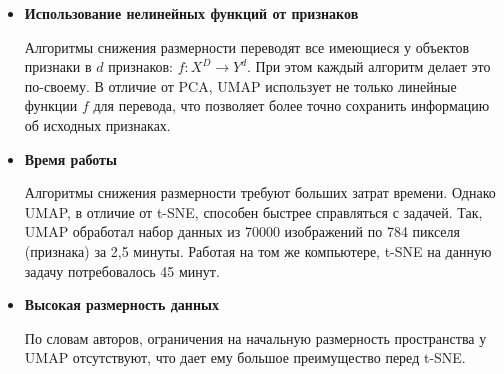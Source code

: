 \begin{itemize}
	\item \textbf{Использование нелинейных функций от признаков}
	
	Алгоритмы снижения размерности переводят все имеющиеся у объектов признаки в $d$ признаков: $f: X^D \rightarrow Y^d$. При этом каждый алгоритм делает это по-своему. В отличие от PCA, UMAP использует не только линейные функции $f$ для перевода, что позволяет более точно сохранить информацию об исходных признаках.
	
	\item \textbf{Время работы}
	
	Алгоритмы снижения размерности требуют больших затрат времени. Однако UMAP, в отличие от t-SNE, способен быстрее справляться с задачей. Так, UMAP обработал набор данных из 70000 изображений по 784 пикселя (признака) за 2,5 минуты. Работая на том же компьютере, t-SNE на данную задачу потребовалось 45 минут.
	
	\item \textbf{Высокая размерность данных}
	
	По словам авторов, ограничения на начальную размерность пространства у UMAP отсутствуют, что дает ему большое преимущество перед t-SNE\cite{mcinnes}.
\end{itemize}

